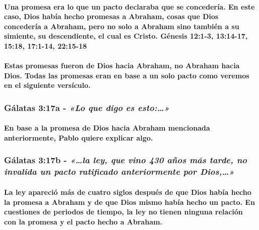 \documentclass[11a pt,twoside]{article}
\newcommand{\scripture}[1]{%
  {\fontsize{12pt}{16pt}\selectfont\ScriptureFont\itshape #1}%
}
\let\oldsubsubsection\subsubsection
\renewcommand{\subsubsection}{\needspace{4\baselineskip}\oldsubsubsection}
\let\oldparagraph\paragraph
\renewcommand{\paragraph}{\needspace{3\baselineskip}\oldparagraph}
\begin{document}
\paragraph{Una promesa era lo que un pacto declaraba que se concedería.
En este caso, Dios había hecho promesas a Abraham, cosas que Dios
concedería a Abraham, pero no solo a Abraham sino también a su simiente,
su descendiente, el cual es Cristo. Génesis 12:1-3, 13:14-17, 15:18,
17:1-14,
22:15-18}\label{una-promesa-era-lo-que-un-pacto-declaraba-que-se-concederuxeda.-en-este-caso-dios-habuxeda-hecho-promesas-a-abraham-cosas-que-dios-concederuxeda-a-abraham-pero-no-solo-a-abraham-sino-tambiuxe9n-a-su-simiente-su-descendiente-el-cual-es-cristo.-guxe9nesis-121-3-1314-17-1518-171-14-2215-18}

\paragraph{Estas promesas fueron de Dios hacia Abraham, no Abraham hacia
Dios. Todas las promesas eran en base a un solo pacto como veremos en el
siguiente
versículo.}\label{estas-promesas-fueron-de-dios-hacia-abraham-no-abraham-hacia-dios.-todas-las-promesas-eran-en-base-a-un-solo-pacto-como-veremos-en-el-siguiente-versuxedculo.}

\subsubsection{\texorpdfstring{Gálatas 3:17a -
\scripture{«Lo que digo es esto:…»}}{Gálatas 3:17a - }}\label{guxe1latas-317a---lo-que-digo-es-esto}

\paragraph{En base a la promesa de Dios hacia Abraham mencionada
anteriormente, Pablo quiere explicar
algo.}\label{en-base-a-la-promesa-de-dios-hacia-abraham-mencionada-anteriormente-pablo-quiere-explicar-algo.}

\subsubsection{\texorpdfstring{Gálatas 3:17b -
\scripture{«…la ley, que vino 430 años más tarde, no invalida un pacto ratificado anteriormente por Dios,…»}}{Gálatas 3:17b - }}\label{guxe1latas-317b---la-ley-que-vino-430-auxf1os-muxe1s-tarde-no-invalida-un-pacto-ratificado-anteriormente-por-dios}

\paragraph{La ley apareció más de cuatro siglos después de que Dios
había hecho la promesa a Abraham y de que Dios mismo había hecho un
pacto. En cuestiones de periodos de tiempo, la ley no tienen ninguna
relación con la promesa y el pacto hecho a
Abraham.}\label{la-ley-apareciuxf3-muxe1s-de-cuatro-siglos-despuuxe9s-de-que-dios-habuxeda-hecho-la-promesa-a-abraham-y-de-que-dios-mismo-habuxeda-hecho-un-pacto.-en-cuestiones-de-periodos-de-tiempo-la-ley-no-tienen-ninguna-relaciuxf3n-con-la-promesa-y-el-pacto-hecho-a-abraham.}
\end{document}
